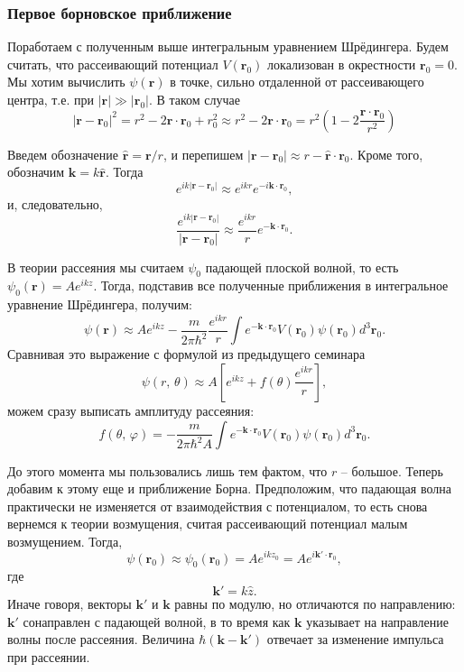 \subsubsection{Первое борновское приближение}

Поработаем с полученным выше интегральным уравнением Шрёдингера. Будем считать,
что рассеивающий потенциал $V(\textbf{r}_0)$ локализован в окрестности
$\textbf{r}_0=0$. Мы хотим вычислить $\psi(\textbf{r})$ в точке, сильно
отдаленной от рассеивающего центра, т.е. при $|\textbf{r}|\gg|\textbf{r}_0|$. В
таком случае
\[
  |\textbf{r}-\textbf{r}_0|^2=r^2-2\textbf{r}\cdot\textbf{r}_0+r_0^2\approx r^2 - 2\textbf{r}\cdot\textbf{r}_0=r^2\left(1-2\frac{\textbf{r}\cdot\textbf{r}_0}{r^2}\right)
\]

Введем обозначение $\hat{\textbf{r}}=\textbf{r}/r$, и перепишем
$|\textbf{r}-\textbf{r}_0|\approx r-\hat{\textbf{r}}\cdot\textbf{r}_0$. Кроме
того, обозначим $\textbf{k}=k\hat{\textbf{r}}$. Тогда
\[
  e^{ik|\textbf{r}-\textbf{r}_0|}\approx e^{ikr}e^{-i\textbf{k}\cdot\textbf{r}_0},
\]
и, следовательно,
\[
  \frac{e^{ik|\textbf{r}-\textbf{r}_0|}}{|\textbf{r}-\textbf{r}_0|}\approx\frac{e^{ikr}}{r}e^{-\textbf{k}\cdot\textbf{r}_0}.
\]

В теории рассеяния мы считаем $\psi_0$ падающей плоской волной, то есть
$\psi_0( \textbf{r} ) = A e^{ikz}$. Тогда, подставив все полученные приближения
в интегральное уравнение Шрёдингера, получим:
\[
  \psi(\mathbf{r})\approx Ae^{ikz}-\frac{m}{2\pi\hbar^2}\frac{e^{ikr}}{r}\int e^{-\mathbf{k}\cdot\mathbf{r}_0}V(\mathbf{r}_0)\psi(\mathbf{r}_0)d^3\mathbf{r}_0.
\]
Сравнивая это выражение с формулой из предыдущего семинара
\[
  \psi(r,\,\theta)\approx A\left[e^{ikz} + f(\theta)\frac{e^{ikr}}{r}\right],
\]
можем сразу выписать амплитуду рассеяния:
\[
  f(\theta, \, \varphi)=-\frac{m}{2\pi\hbar^2 A}\int e^{-\textbf{k}\cdot \textbf{r}_0}V(\textbf{r}_0)\psi(\textbf{r}_0)d^3\textbf{r}_0.
\]

До этого момента мы пользовались лишь тем фактом, что $r$ -- большое. Теперь
добавим к этому еще и приближение Борна. Предположим, что падающая волна
практически не изменяется от взаимодействия с потенциалом, то есть снова
вернемся к теории возмущения, считая рассеивающий потенциал малым возмущением.
Тогда,
\[
  \psi(\textbf{r}_0)\approx\psi_0(\textbf{r}_0)=Ae^{ikz_0}=Ae^{i\textbf{k}'\cdot\textbf{r}_0},
\]
где
\[
  \textbf{k}'=k\hat{z}.
\]
Иначе говоря, векторы $\textbf{k}'$ и $\textbf{k}$ равны по модулю, но
отличаются по направлению: $\textbf{k}'$ сонаправлен с падающей волной, в то
время как $\textbf{k}$ указывает на направление волны после рассеяния. Величина
$\hbar(\textbf{k}-\textbf{k}')$ отвечает за изменение импульса при рассеянии.

